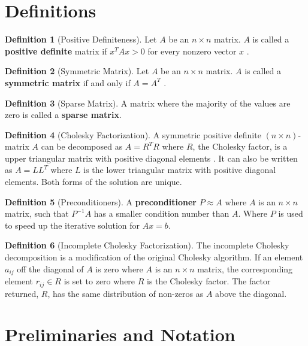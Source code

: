 \documentclass[11pt]{article}
\theoremstyle{definition}
\newtheorem{definition}{Definition}[section]
\begin{document}
\section{Definitions}

\begin{definition}[Positive Definiteness]
Let $A$ be an $n\times n$ matrix. $A$ is called a \textbf{positive definite} matrix if $x^TAx>0$ for every nonzero vector $x$ \cite{sympd}\cite{positivedefinite}.
\end{definition}

\begin{definition}[Symmetric Matrix]
Let $A$ be an $n\times n$ matrix. $A$ is called a \textbf{symmetric matrix} if and only if $A=A^T$ \cite{sympd}.
\end{definition}

\begin{definition}[Sparse Matrix]
A matrix where the majority of the values are zero is called a \textbf{sparse matrix}.
\end{definition}

\begin{definition}[Cholesky Factorization]
A symmetric positive definite $(n\times n)$-matrix $A$ can be decomposed as $A=R^TR$ where $R$, the Cholesky factor, is a upper triangular matrix with positive diagonal elements \cite{golub83matrix}. It can also be written as $A=LL^T$ where $L$ is the lower triangular matrix with positive diagonal elements. Both forms of the solution are unique.
\end{definition}

\begin{definition}[Preconditioners]
A \textbf{preconditioner} $P\approx A$ where $A$ is an $n\times n$ matrix, such that $P^{-1}A$ has a smaller condition number than $A$. Where $P$ is used to speed up the iterative solution for $Ax=b$. \cite{preconditioners}
\end{definition}

\begin{definition}[Incomplete Cholesky Factorization]
The incomplete Cholesky decomposition is a modification of the original Cholesky algorithm. If an element $a_{ij}$ off the diagonal of $A$ is zero where $A$ is an $n\times n$ matrix, the corresponding element $r_{ij}\in R$ is set to zero where $R$ is the Cholesky factor. The factor returned, $R$, has the same distribution of non-zeros as $A$ above the diagonal.
\end{definition}

\section{Preliminaries and Notation}
\end{document}
